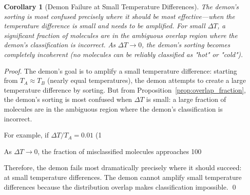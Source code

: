 \documentclass[12pt,a4paper]{article}
\newtheorem{corollary}[theorem]{Corollary}
\theoremstyle{definition}
\theoremstyle{remark}
\begin{document}
\begin{corollary}[Demon Failure at Small Temperature Differences]
\label{cor:demon_failure_small_delta_t}
The demon's sorting is most confused precisely where it should be most effective—when the temperature difference is small and needs to be amplified. For small $\Delta T$, a significant fraction of molecules are in the ambiguous overlap region where the demon's classification is incorrect. As $\Delta T \to 0$, the demon's sorting becomes completely incoherent (no molecules can be reliably classified as "hot" or "cold").
\end{corollary}

\begin{proof}
The demon's goal is to amplify a small temperature difference: starting from $T_A \approx T_B$ (nearly equal temperatures), the demon attempts to create a large temperature difference by sorting. But from Proposition~\ref{prop:overlap_fraction}, the demon's sorting is most confused when $\Delta T$ is small: a large fraction of molecules are in the ambiguous region where the demon's classification is incorrect.

For example, if $\Delta T / T_A = 0.01$ (1%

As $\Delta T \to 0$, the fraction of misclassified molecules approaches 100%

Therefore, the demon fails most dramatically precisely where it should succeed: at small temperature differences. The demon cannot amplify small temperature differences because the distribution overlap makes classification impossible. \qed
\end{proof}
\end{document}
